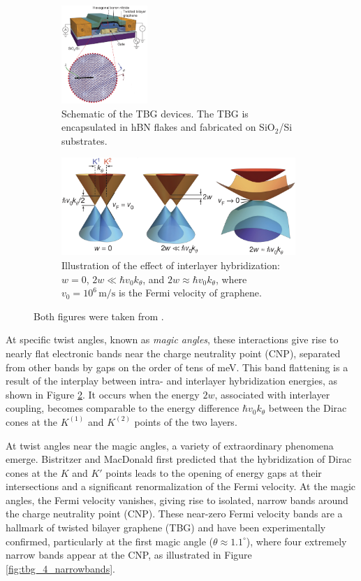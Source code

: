 \begin{figure}[H]
\centering
\begin{subfigure}{.37\textwidth}
  \centering
  \includegraphics[height=10em]{fig/tbg_device.png}
  \caption{Schematic of the TBG devices. The TBG is encapsulated in hBN flakes and fabricated on SiO$_2$/Si substrates.}
  \label{fig:tbg_device}
\end{subfigure} \hfill
\begin{subfigure}{.60\textwidth}
  \centering
  \includegraphics[height=10em]{fig/tbg_dirac_cones.png}
  \caption{Illustration of the effect of interlayer hybridization: \( w = 0 \), \( 2w \ll \hbar v_0 k_\theta \), and \( 2w \approx \hbar v_0 k_\theta \), where \( v_0 = 10^6 \, \text{m/s} \) is the Fermi velocity of graphene.}
  \label{fig:tbg_dirac_cones}
\end{subfigure}
\caption{Both figures were taken from \cite{cao2018_correlated}.}
\label{fig:tbg_figures_taken_from_correlated_insul}
\end{figure}

At specific twist angles, known as \textit{magic angles}, these interactions give rise to nearly flat electronic bands near the charge neutrality point (CNP), separated from other bands by gaps on the order of tens of meV. This band flattening is a result of the interplay between intra- and interlayer hybridization energies, as shown in Figure \ref{fig:tbg_dirac_cones}. It occurs when the energy \(2w\), associated with interlayer coupling, becomes comparable to the energy difference \(\hbar v_0 k_\theta\) between the Dirac cones at the \(K^{(1)}\) and \(K^{(2)}\) points of the two layers.

At twist angles near the magic angles, a variety of extraordinary phenomena emerge. Bistritzer and MacDonald \cite{macdonald2011} first predicted that the hybridization of Dirac cones at the \(K\) and \(K'\) points leads to the opening of energy gaps at their intersections and a significant renormalization of the Fermi velocity. At the magic angles, the Fermi velocity vanishes, giving rise to isolated, narrow bands around the charge neutrality point (CNP). These near-zero Fermi velocity bands are a hallmark of twisted bilayer graphene (TBG) and have been experimentally confirmed, particularly at the first magic angle (\(\theta \approx 1.1^\circ\)), where four extremely narrow bands appear at the CNP, as illustrated in Figure \ref{fig:tbg_4_narrowbands}.

